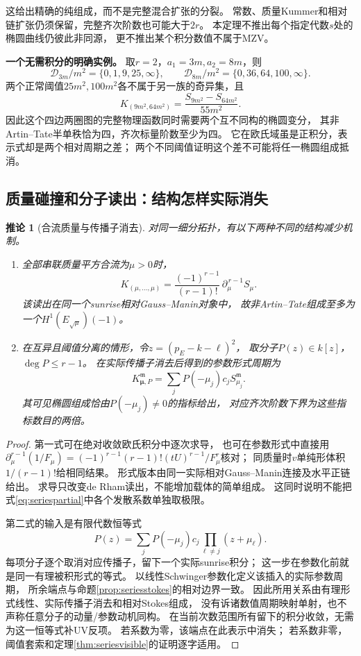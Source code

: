 \documentclass[11pt,a4paper]{ctexart}
\theoremstyle{cnplain}\newtheorem{theorem}{定理}[section]
\newtheorem{corollary}[theorem]{推论}
\theoremstyle{definition}\newtheorem{definition}[theorem]{定义}
\theoremstyle{remark}\newtheorem{remark}[theorem]{注}
\begin{document}
这给出精确的纯组成，而不是完整混合扩张的分裂。
常数、质量Kummer和相对链扩张仍须保留，完整齐次阶数也可能大于$2r$。
本定理不推出每个指定代数$s$处的椭圆曲线仍彼此非同源，
更不推出某个积分数值不属于MZV。

\textbf{一个无需积分的明确实例。}
取$r=2$，$a_1=3m,a_2=8m$，则
\[
 \mathcal D_{3m}/m^2=\{0,1,9,25,\infty\},\qquad
 \mathcal D_{8m}/m^2=\{0,36,64,100,\infty\}.
\]
两个正常阈值$25m^2,100m^2$各不属于另一族的奇异集，且
\[
 K_{(9m^2,64m^2)}
   =\frac{S_{9m^2}-S_{64m^2}}{55m^2}.
\]
因此这个四边两圈图的完整物理函数同时需要两个互不同构的椭圆变分，
其非Artin--Tate半单秩恰为四，齐次标量阶数至少为四。
它在欧氏域虽是正积分，表示式却是两个相对周期之差；
两个不同阈值证明这个差不可能将任一椭圆组成抵消。

\subsection{质量碰撞和分子读出：结构怎样实际消失}
\begin{corollary}[合流质量与传播子消去]\label{cor:seriesselect}
对同一细分拓扑，有以下两种不同的结构减少机制。
\begin{enumerate}
\item 全部串联质量平方合流为$\mu>0$时，
\[
 K_{(\mu,\ldots,\mu)}
   =\frac{(-1)^{r-1}}{(r-1)!}\,\partial_\mu^{\,r-1}S_\mu .
\]
该读出在同一个sunrise相对Gauss--Manin对象中，
故非Artin--Tate组成至多为一个$H^1(E_{\sqrt\mu})(-1)$。
\item 在互异且阈值分离的情形，令$z=(p_E-k-\ell)^2$，
取分子$P(z)\in k[z]$，$\deg P\le r-1$。
在实际传播子消去后得到的参数形式周期为
\[
 K_{\boldsymbol\mu,P}^{\mathfrak m}
    =\sum_j P(-\mu_j)c_jS_{\mu_j}^{\mathfrak m}.
\]
其可见椭圆组成恰由$P(-\mu_j)\ne0$的指标给出，
对应齐次阶数下界为这些指标数目的两倍。
\end{enumerate}
\end{corollary}
\begin{proof}
第一式可在绝对收敛欧氏积分中逐次求导，
也可在参数形式中直接用
$\partial_\mu^{r-1}(1/F_\mu)
=(-1)^{r-1}(r-1)!(tU)^{r-1}/F_\mu^r$核对；
同质量时$v$单纯形体积$1/(r-1)!$给相同结果。
形式版本由同一实际相对Gauss--Manin连接及水平正链给出。
求导只改变de Rham读出，不能增加载体的简单组成。
这同时说明不能把式\eqref{eq:seriespartial}中各个发散系数单独取极限。

第二式的输入是有限代数恒等式
\[
 P(z)=\sum_j P(-\mu_j)c_j\prod_{\ell\ne j}(z+\mu_\ell).
\]
每项分子逐个取消对应传播子，留下一个实际sunrise积分；
这一步在参数化前就是同一有理被积形式的等式。
以线性Schwinger参数化定义该插入的实际参数周期，
所余端点与命题\ref{prop:seriesstokes}的相对边界一致。
因此所用关系由有理形式线性、实际传播子消去和相对Stokes组成，
没有诉诸数值周期映射单射，也不声称任意分子的动量/参数动机同构。
在当前次数范围所有留下的积分收敛，无需为这一恒等式补UV反项。
若系数为零，该端点在此表示中消失；
若系数非零，阈值套索和定理\ref{thm:seriesvisible}的证明逐字适用。
\end{proof}
\end{document}
